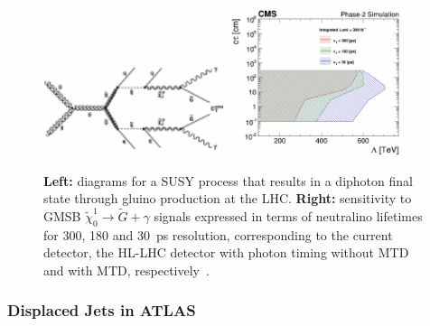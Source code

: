 \begin{figure}[t]\begin{center}
\includegraphics[width=0.47\textwidth]{figures/MTD/diagram.pdf}
\includegraphics[width=0.47\textwidth]{figures/MTD/Limits_excl_2D_ComparingRes.pdf}
\caption{
{\bf Left:} diagrams for a SUSY process that results in a diphoton final state through gluino production at the LHC. {\bf Right:} sensitivity to GMSB $\tilde{\chi}_0^1 \to \tilde{G} + \gamma$ signals expressed in terms of neutralino lifetimes for 300, 180 and 30~ps resolution, corresponding to the current detector, the HL-LHC detector with photon timing without MTD and with MTD, respectively~\cite{MTD_TP}.
}
\label{fig:cmsupgrade_photon}
\end{center}
\end{figure}

\subsubsection{Displaced Jets in ATLAS}


